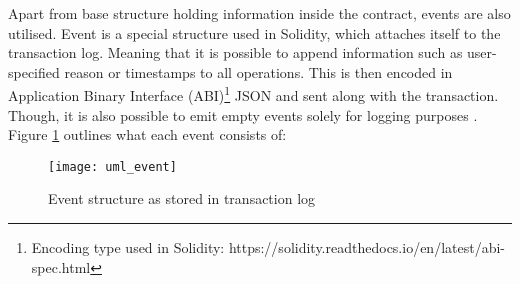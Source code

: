 Apart from base structure holding information inside the contract, events are also utilised. Event is a special structure used in Solidity, which attaches itself to the transaction log. Meaning that it is possible to append information such as user-specified reason or timestamps to all operations. This is then encoded in Application Binary Interface (ABI)\footnote{Encoding type used in Solidity: https://solidity.readthedocs.io/en/latest/abi-spec.html} JSON and sent along with the transaction. Though, it is also possible to emit empty events solely for logging purposes \citep{dannen2017introducing}.  Figure \ref{fig:uml_event} outlines what each event consists of:
\begin{figure}[h]
    \centering
    \texttt{[image: uml\_event]}
    \caption{Event structure as stored in transaction log}
    \label{fig:uml_event}
\end{figure}

